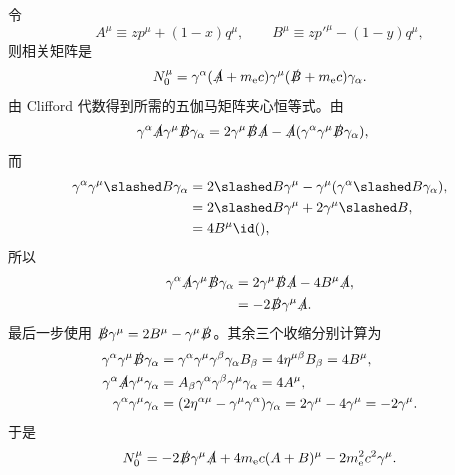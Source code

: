 \begin{derivation}
令
\begin{equation*}
 A^\mu\equiv zp^\mu+(1-x)q^\mu,
 \qquad
 B^\mu\equiv zp'^\mu-(1-y)q^\mu,
\end{equation*}
则相关矩阵是
\begin{equation*}
 N_0^\mu
 =\gamma^\alpha(\slashed A+m_{\mathrm e} c)
 \gamma^\mu(\slashed B+m_{\mathrm e} c)\gamma_\alpha.
\end{equation*}
由 Clifford 代数得到所需的五伽马矩阵夹心恒等式。由
\begin{align*}
 \gamma^\alpha\slashed A\gamma^\mu\slashed B\gamma_\alpha
 &=2\gamma^\mu\slashed B\slashed A
 -\slashed A(\gamma^\alpha\gamma^\mu\slashed B\gamma_\alpha),
\end{align*}
而
\begin{align*}
 \gamma^\alpha\gamma^\mu\slashed B\gamma_\alpha
 &=2\slashed B\gamma^\mu
 -\gamma^\mu(\gamma^\alpha\slashed B\gamma_\alpha),\\
 &=2\slashed B\gamma^\mu+2\gamma^\mu\slashed B,\\
 &=4B^\mu\id(),
\end{align*}
所以
\begin{align*}
 \gamma^\alpha\slashed A\gamma^\mu\slashed B\gamma_\alpha
 &=2\gamma^\mu\slashed B\slashed A-4B^\mu\slashed A,\\
 &=-2\slashed B\gamma^\mu\slashed A.
 \end{align*}
最后一步使用
$\slashed B\gamma^\mu=2B^\mu-\gamma^\mu\slashed B$。其余三个收缩分别计算为
\begin{align*}
 \gamma^\alpha\gamma^\mu\slashed B\gamma_\alpha
 &=\gamma^\alpha\gamma^\mu\gamma^\beta\gamma_\alpha B_\beta
 =4\eta^{\mu\beta}B_\beta
 =4B^\mu,\\
 \gamma^\alpha\slashed A\gamma^\mu\gamma_\alpha
 &=A_\beta\gamma^\alpha\gamma^\beta\gamma^\mu\gamma_\alpha
 =4A^\mu,\\
 \gamma^\alpha\gamma^\mu\gamma_\alpha
 &=(2\eta^{\alpha\mu}-\gamma^\mu\gamma^\alpha)\gamma_\alpha
 =2\gamma^\mu-4\gamma^\mu
 =-2\gamma^\mu.
\end{align*}
于是
\begin{equation*}
 N_0^\mu
 =-2\slashed B\gamma^\mu\slashed A
 +4m_{\mathrm e} c(A+B)^\mu
 -2m_{\mathrm e}^2c^2\gamma^\mu.
 \end{equation*}


\end{derivation}
